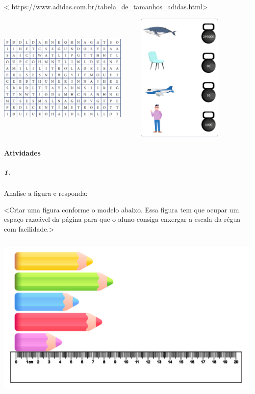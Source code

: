 \textless{}
https://www.adidas.com.br/tabela\_de\_tamanhos\_adidas.html\textgreater{}

\includegraphics[width=2.47525in,height=2.47010in]{media/image40.png}\includegraphics[width=2.51046in,height=2.50000in]{media/image41.png}

\paragraph{Atividades }\label{atividades-2}

\subparagraph{1.}\label{section-28}

Analise a figura e responda:

\textless{}Criar uma figura conforme o modelo abaixo. Essa figura tem
que ocupar um espaço razoável da página para que o aluno consiga
enxergar a escala da régua com facilidade.\textgreater{}

\includegraphics[width=5.76042in,height=3.32424in]{media/image42.png}

